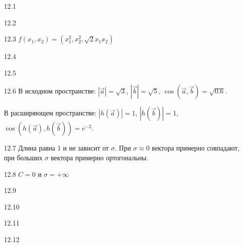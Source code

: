 \protect \hypertarget {soln:12.1}{}
\begin{solution}{{12.1}}
\end{solution}
\protect \hypertarget {soln:12.2}{}
\begin{solution}{{12.2}}
\end{solution}
\protect \hypertarget {soln:12.3}{}
\begin{solution}{{12.3}}
$f(x_1,x_2)=(x_1^2,x_2^2,\sqrt{2}x_1x_2)$
\end{solution}
\protect \hypertarget {soln:12.4}{}
\begin{solution}{{12.4}}
\end{solution}
\protect \hypertarget {soln:12.5}{}
\begin{solution}{{12.5}}
\end{solution}
\protect \hypertarget {soln:12.6}{}
\begin{solution}{{12.6}}
В исходном пространстве: $|\vec{a}|=\sqrt{3}$, $|\vec{b}|=\sqrt{5}$, $\cos(\vec{a},\vec{b})=\sqrt{0.6}$.

В расширяющем пространстве: $|h(\vec{a})|=1$, $|h(\vec{b})|=1$, $\cos(h(\vec{a}),h(\vec{b}))=e^{-2}$.
\end{solution}
\protect \hypertarget {soln:12.7}{}
\begin{solution}{{12.7}}
Длина равна 1 и не зависит от $\sigma$. При $\sigma \approx 0$ вектора примерно совпадают, при больших $\sigma$ вектора примерно ортогональны.
\end{solution}
\protect \hypertarget {soln:12.8}{}
\begin{solution}{{12.8}}
$C=0$ и $\sigma=+\infty$
\end{solution}
\protect \hypertarget {soln:12.9}{}
\begin{solution}{{12.9}}
\end{solution}
\protect \hypertarget {soln:12.10}{}
\begin{solution}{{12.10}}
\end{solution}
\protect \hypertarget {soln:12.11}{}
\begin{solution}{{12.11}}
\end{solution}
\protect \hypertarget {soln:12.12}{}
\begin{solution}{{12.12}}
\end{solution}
